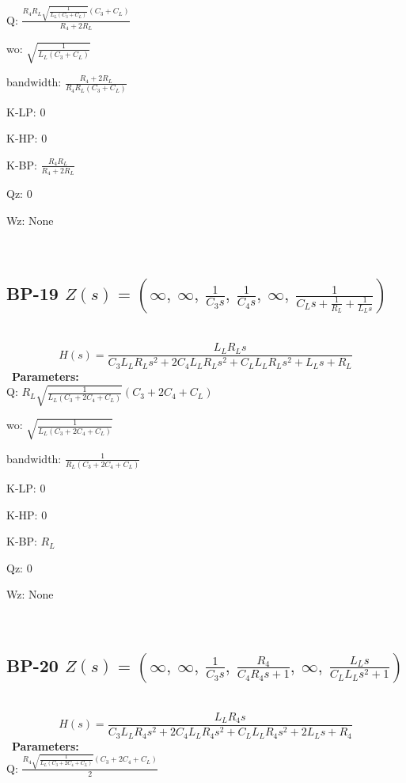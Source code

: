 \documentclass{article}
\begin{document}
Q: $\frac{R_{4} R_{L} \sqrt{\frac{1}{L_{L} \left(C_{3} + C_{L}\right)}} \left(C_{3} + C_{L}\right)}{R_{4} + 2 R_{L}}$\ 

wo: $\sqrt{\frac{1}{L_{L} \left(C_{3} + C_{L}\right)}}$\ 

bandwidth: $\frac{R_{4} + 2 R_{L}}{R_{4} R_{L} \left(C_{3} + C_{L}\right)}$\ 

K-LP: $0$\ 

K-HP: $0$\ 

K-BP: $\frac{R_{4} R_{L}}{R_{4} + 2 R_{L}}$\ 

Qz: $0$\ 

Wz: $\text{None}$\ 

\ 

\subsection{BP-19 $Z(s) = \left( \infty, \  \infty, \  \frac{1}{C_{3} s}, \  \frac{1}{C_{4} s}, \  \infty, \  \frac{1}{C_{L} s + \frac{1}{R_{L}} + \frac{1}{L_{L} s}}\right)$ } \ 
\textbf{\[H(s) = \frac{L_{L} R_{L} s}{C_{3} L_{L} R_{L} s^{2} + 2 C_{4} L_{L} R_{L} s^{2} + C_{L} L_{L} R_{L} s^{2} + L_{L} s + R_{L}}\] } \ 
\textbf{Parameters:}\\ 

Q: $R_{L} \sqrt{\frac{1}{L_{L} \left(C_{3} + 2 C_{4} + C_{L}\right)}} \left(C_{3} + 2 C_{4} + C_{L}\right)$\ 

wo: $\sqrt{\frac{1}{L_{L} \left(C_{3} + 2 C_{4} + C_{L}\right)}}$\ 

bandwidth: $\frac{1}{R_{L} \left(C_{3} + 2 C_{4} + C_{L}\right)}$\ 

K-LP: $0$\ 

K-HP: $0$\ 

K-BP: $R_{L}$\ 

Qz: $0$\ 

Wz: $\text{None}$\ 

\ 

\subsection{BP-20 $Z(s) = \left( \infty, \  \infty, \  \frac{1}{C_{3} s}, \  \frac{R_{4}}{C_{4} R_{4} s + 1}, \  \infty, \  \frac{L_{L} s}{C_{L} L_{L} s^{2} + 1}\right)$ } \ 
\textbf{\[H(s) = \frac{L_{L} R_{4} s}{C_{3} L_{L} R_{4} s^{2} + 2 C_{4} L_{L} R_{4} s^{2} + C_{L} L_{L} R_{4} s^{2} + 2 L_{L} s + R_{4}}\] } \ 
\textbf{Parameters:}\\ 

Q: $\frac{R_{4} \sqrt{\frac{1}{L_{L} \left(C_{3} + 2 C_{4} + C_{L}\right)}} \left(C_{3} + 2 C_{4} + C_{L}\right)}{2}$\ 
\end{document}
